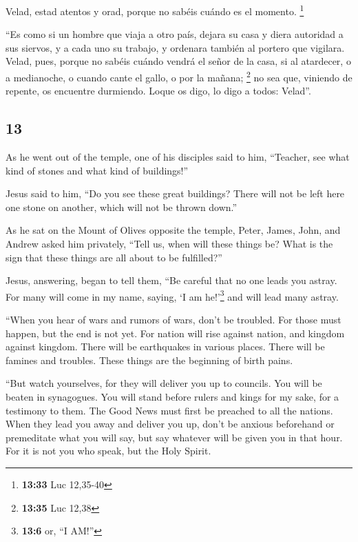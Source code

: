 \begin{paracol}{2}
 Velad, estad atentos y orad, porque no sabéis cuándo es
el momento. \footnote{\textbf{13:33} Luc 12,35-40}

 ``Es como si un hombre que viaja a otro país, dejara su
casa y diera autoridad a sus siervos, y a cada uno su trabajo, y
ordenara también al portero que vigilara.  Velad, pues,
porque no sabéis cuándo vendrá el señor de la casa, si al atardecer, o a
medianoche, o cuando cante el gallo, o por la mañana; \footnote{\textbf{13:35}
  Luc 12,38}  no sea que, viniendo de repente, os
encuentre durmiendo.  Loque os digo, lo digo a todos:
Velad''.

\switchcolumn
\begin{otherlanguage}{english}

\hypertarget{section-24}{%
\section{13}\label{section-24}}

 As he went out of the temple, one of his disciples said
to him, ``Teacher, see what kind of stones and what kind of buildings!''

 Jesus said to him, ``Do you see these great buildings?
There will not be left here one stone on another, which will not be
thrown down.''

 As he sat on the Mount of Olives opposite the temple,
Peter, James, John, and Andrew asked him privately, 
``Tell us, when will these things be? What is the sign that these things
are all about to be fulfilled?''

 Jesus, answering, began to tell them, ``Be careful that
no one leads you astray.  For many will come in my name,
saying, `I am he!'\footnote{\textbf{13:6} or, ``I AM!''} and will lead
many astray.

 ``When you hear of wars and rumors of wars, don't be
troubled. For those must happen, but the end is not yet. 
For nation will rise against nation, and kingdom against kingdom. There
will be earthquakes in various places. There will be famines and
troubles. These things are the beginning of birth pains.

 ``But watch yourselves, for they will deliver you up to
councils. You will be beaten in synagogues. You will stand before rulers
and kings for my sake, for a testimony to them.  The Good
News must first be preached to all the nations.  When
they lead you away and deliver you up, don't be anxious beforehand or
premeditate what you will say, but say whatever will be given you in
that hour. For it is not you who speak, but the Holy Spirit.


\end{otherlanguage}
\end{paracol}

